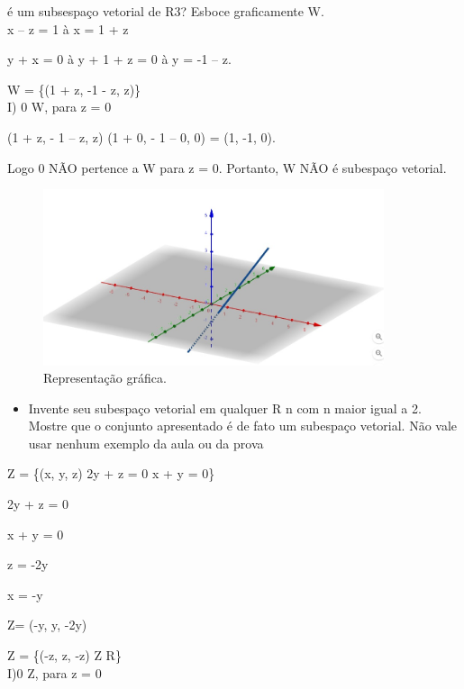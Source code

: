 \documentclass{article}
\begin{document}
    \item é um subsespaço vetorial de R3? Esboce graficamente W.\\

x – z = 1 à x = 1 + z

y + x = 0 à y + 1 + z = 0 à y = -1 – z. 

W = \{(1 + z, -1 - z, z)\} \\

I) 0 \in W, para z = 0 

(1 + z, - 1 – z, z) \to (1 + 0, - 1 – 0, 0) = (1, -1, 0).  

Logo 0 NÃO pertence a W para z = 0. Portanto, W NÃO é subespaço vetorial.\\ 

\begin{figure}[!h]
\centering
\includegraphics[width=10cm]{grafico.jpeg}
\caption{Representação gráfica.}
\label{fig:grafico.jpeg}
\end{figure}


\begin{itemize}
\item Invente seu subespaço vetorial em qualquer R n com n maior igual a 2. Mostre que o conjunto apresentado é de fato
um subespaço vetorial. Não vale usar nenhum exemplo da aula ou da prova
\end{itemize}

Z = \{(x, y, z) \mid  2y + z = 0 \land  x + y = 0\} 

 

2y + z = 0 

x + y = 0 

 

z = -2y 

x = -y  

 

Z= (-y, y, -2y) 

Z = \{(-z, z, -z) \mid  Z \in R\}\\

 

I)0 \in Z, para z = 0 
\end{document}
